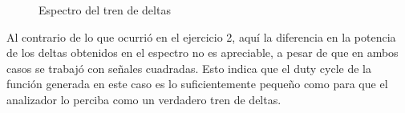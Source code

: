 \documentclass[../../labo_tp5_main.tex]{subfiles}
\begin{document}
\begin{figure}[H]
	\centering
	\caption{Espectro del tren de deltas}
\end{figure}

Al contrario de lo que ocurri\'o en el ejercicio 2, aqu\'i la diferencia en la potencia de los deltas obtenidos en el espectro no es apreciable, a pesar de que en ambos casos se trabaj\'o con se\~nales cuadradas. Esto indica que el duty cycle de la funci\'on generada en este caso es lo suficientemente peque\~no como para que el analizador lo perciba como un verdadero tren de deltas.
\end{document}
